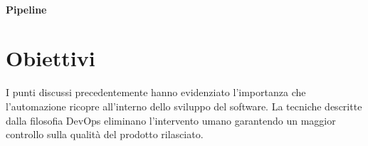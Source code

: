 
\paragraph{Pipeline}

\section{Obiettivi}
I punti discussi precedentemente hanno evidenziato l'importanza che l'automazione ricopre all'interno dello sviluppo del software. La tecniche descritte dalla filosofia DevOps eliminano l'intervento umano garantendo un maggior controllo sulla qualità del prodotto rilasciato. 


